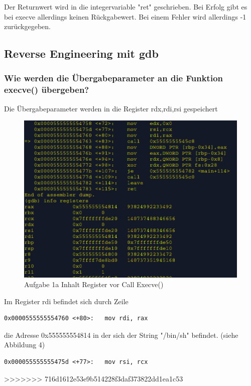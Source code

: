 \documentclass[12pt]{article}
\begin{document}
Der Returnwert wird in die integervariable "ret" geschrieben.
Bei Erfolg gibt es bei  execve allerdings keinen Rückgabewert.
Bei einem Fehler wird allerdings -1 zurückgegeben.
\newpage
\subsection{Reverse Engineering mit gdb}

\subsubsection{Wie werden die Übergabeparameter an die Funktion execve()
übergeben?}
Die Übergabeparameter werden in die Register 
rdx,rdi,rsi gespeichert

\begin{figure}[h!]
	\includegraphics[width=15cm]{../images/Bufferoverflow_Aufgabe1a_Reg_b4_call.jpg}
	\caption{Aufgabe 1a Inhalt Register vor Call Execve()}
\end{figure}


\newpage

Im Register rdi befindet sich durch 
Zeile 
\begin{lstlisting}
0x0000555555554760 <+80>:   mov rdi, rax
\end{lstlisting}
die Adresse 0x555555554814 in der sich der String "/bin/sh" befindet. (siehe Abbildung 4)
\begin{lstlisting}
0x000055555555475d <+77>:   mov rsi, rcx
\end{lstlisting} 

>>>>>>> 716d1612e53e9b514228f3daf373822dd1ea1c53
\end{document}
